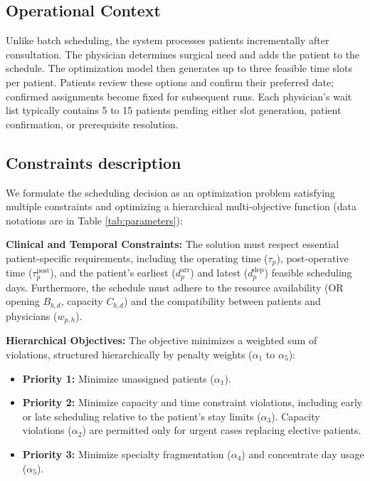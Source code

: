 \subsection{Operational Context}
Unlike batch scheduling, the system processes patients incrementally after consultation. The physician determines surgical need and adds the patient to the schedule. The optimization model then generates up to three feasible time slots per patient. Patients review these options and confirm their preferred date; confirmed assignments become fixed for subsequent runs. Each physician's wait list typically contains 5 to 15 patients pending either slot generation, patient confirmation, or prerequisite resolution.


\subsection{Constraints description}
We formulate the scheduling decision as an optimization problem satisfying multiple constraints and optimizing a hierarchical multi-objective function (data notations are in Table \ref{tab:parameters}):

\textbf{Clinical and Temporal Constraints:} The solution must respect essential patient-specific requirements, including the operating time ($\tau_p$), post-operative time ($\tau^{\text{post}}_p$), and the patient's earliest ($d^{\text{arr}}_p$) and latest ($d^{\text{dep}}_p$) feasible scheduling days. Furthermore, the schedule must adhere to the resource availability (OR opening $B_{b,d}$, capacity $C_{b,d}$) and the compatibility between patients and physicians ($w_{p,h}$).
    
\textbf{Hierarchical Objectives:} The objective minimizes a weighted sum of violations, structured hierarchically by penalty weights ($\alpha_1$ to $\alpha_5$):
    \begin{itemize}
        \item \textbf{Priority 1:} Minimize unassigned patients ($\alpha_1$).
        \item \textbf{Priority 2:} Minimize capacity and time constraint violations, including early or late scheduling relative to the patient's stay limits ($\alpha_3$). Capacity violations ($\alpha_2$) are permitted only for urgent cases replacing elective patients.
        \item \textbf{Priority 3:} Minimize specialty fragmentation ($\alpha_4$) and concentrate day usage ($\alpha_5$).
    \end{itemize}


